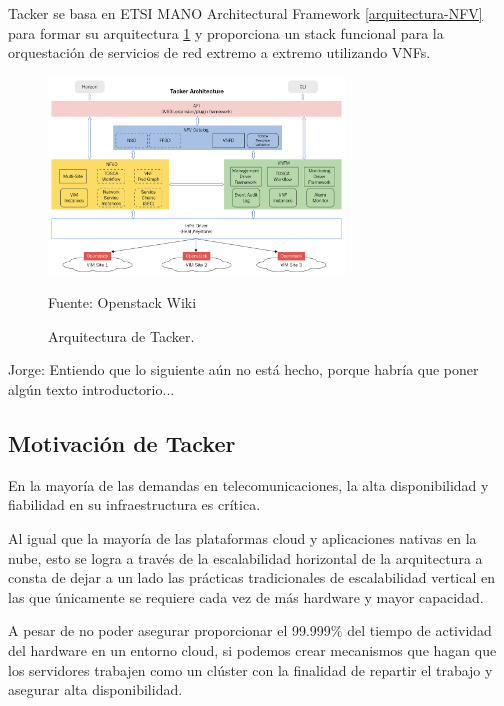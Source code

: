 Tacker se basa en ETSI MANO Architectural Framework \ref{arquitectura-NFV} para formar su arquitectura \ref{TackerArquitectura} y proporciona un stack funcional para la orquestación de servicios de red extremo a extremo utilizando VNFs.\cite{noauthor_tacker_nodate}

\begin{figure}
    \centering
    \includegraphics[width=0.7\textwidth]{imagenes/capitulo4/TackerArquitectura.png}
    \caption{Arquitectura de Tacker.}
	\vspace{0.3cm}
    \footnotesize{Fuente: Openstack Wiki}
    \label{TackerArquitectura}
\end{figure}

\begin{tcolorbox}[colback=orange!5!white,colframe=orange!75!black]
Jorge: Entiendo que lo siguiente aún no está hecho, porque habría que poner algún texto introductorio...
\end{tcolorbox}


\subsection{Motivación de Tacker}
En la mayoría de las demandas en telecomunicaciones, la alta disponibilidad y fiabilidad en su infraestructura es crítica. 

Al igual que la mayoría de las plataformas cloud y aplicaciones nativas en la nube, esto se logra a través de la escalabilidad horizontal de la arquitectura a consta de dejar a un lado las prácticas tradicionales de escalabilidad vertical en las que únicamente se requiere cada vez de más hardware y mayor capacidad. 

A pesar de no poder asegurar proporcionar el 99.999\% del tiempo de actividad del hardware en un entorno cloud, si podemos crear mecanismos que hagan que los servidores trabajen como un clúster con la finalidad de repartir el trabajo y asegurar alta disponibilidad. 

